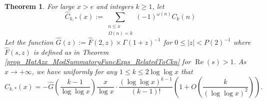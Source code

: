 \documentclass[11pt,reqno,a4letter]{article}
\numberwithin{figure}{section}
\numberwithin{table}{section}
\theoremstyle{plain}
\newtheorem{theorem}{Theorem}
\numberwithin{theorem}{section}
\theoremstyle{definition}
\renewcommand{\Re}{\operatorname{Re}}
\begin{document}
\begin{theorem} 
\label{theorem_CnkSpCasesScaledSummatoryFuncs} 
For large $x > e$ and integers $k \geq 1$, let 
\[
\widehat{C}_{k,\ast}(x) := \sum_{\substack{n \leq x \\ \Omega(n) = k}} 
     (-1)^{\omega(n)} C_k(n) 
\]
Let the function $\widehat{G}(z) := \widehat{F}(2, z) \times \Gamma(1+z)^{-1}$ for 
$0 \leq |z| < P(2)^{-1}$ where $\widehat{F}(s, z)$ is defined as 
in Theorem \ref{prop_HatAzx_ModSummatoryFuncExps_RelatedToCkn} for $\Re(s) > 1$. 
As $x \rightarrow +\infty$, we have uniformly for any $1 \leq k \leq 2\log\log x$ that 
\[
\widehat{C}_{k,\ast}(x) = -\widehat{G}\left(\frac{k-1}{\log\log x}\right) \frac{x}{\log x} \cdot 
     \frac{(\log\log x)^{k-1}}{(k-1)!} \left( 
     1 + O\left(\frac{k}{(\log\log x)^2}\right)\right). 
\]
\end{theorem} 
\end{document}
